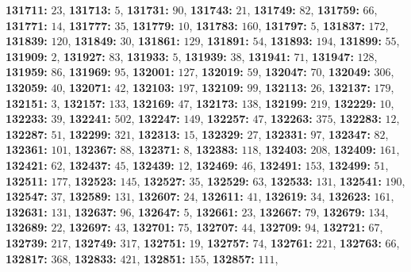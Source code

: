 \textsf{\bfseries 131711:} $23$, \textsf{\bfseries 131713:} $5$, \textsf{\bfseries 131731:} $90$, \textsf{\bfseries 131743:} $21$, \textsf{\bfseries 131749:} $82$, \textsf{\bfseries 131759:} $66$, \textsf{\bfseries 131771:} $14$, \textsf{\bfseries 131777:} $35$, \textsf{\bfseries 131779:} $10$, \textsf{\bfseries 131783:} $160$, \textsf{\bfseries 131797:} $5$, \textsf{\bfseries 131837:} $172$, \textsf{\bfseries 131839:} $120$, \textsf{\bfseries 131849:} $30$, \textsf{\bfseries 131861:} $129$, \textsf{\bfseries 131891:} $54$, \textsf{\bfseries 131893:} $194$, \textsf{\bfseries 131899:} $55$, \textsf{\bfseries 131909:} $2$, \textsf{\bfseries 131927:} $83$, \textsf{\bfseries 131933:} $5$, \textsf{\bfseries 131939:} $38$, \textsf{\bfseries 131941:} $71$, \textsf{\bfseries 131947:} $128$, \textsf{\bfseries 131959:} $86$, \textsf{\bfseries 131969:} $95$, \textsf{\bfseries 132001:} $127$, \textsf{\bfseries 132019:} $59$, \textsf{\bfseries 132047:} $70$, \textsf{\bfseries 132049:} $306$, \textsf{\bfseries 132059:} $40$, \textsf{\bfseries 132071:} $42$, \textsf{\bfseries 132103:} $197$, \textsf{\bfseries 132109:} $99$, \textsf{\bfseries 132113:} $26$, \textsf{\bfseries 132137:} $179$, \textsf{\bfseries 132151:} $3$, \textsf{\bfseries 132157:} $133$, \textsf{\bfseries 132169:} $47$, \textsf{\bfseries 132173:} $138$, \textsf{\bfseries 132199:} $219$, \textsf{\bfseries 132229:} $10$, \textsf{\bfseries 132233:} $39$, \textsf{\bfseries 132241:} $502$, \textsf{\bfseries 132247:} $149$, \textsf{\bfseries 132257:} $47$, \textsf{\bfseries 132263:} $375$, \textsf{\bfseries 132283:} $12$, \textsf{\bfseries 132287:} $51$, \textsf{\bfseries 132299:} $321$, \textsf{\bfseries 132313:} $15$, \textsf{\bfseries 132329:} $27$, \textsf{\bfseries 132331:} $97$, \textsf{\bfseries 132347:} $82$, \textsf{\bfseries 132361:} $101$, \textsf{\bfseries 132367:} $88$, \textsf{\bfseries 132371:} $8$, \textsf{\bfseries 132383:} $118$, \textsf{\bfseries 132403:} $208$, \textsf{\bfseries 132409:} $161$, \textsf{\bfseries 132421:} $62$, \textsf{\bfseries 132437:} $45$, \textsf{\bfseries 132439:} $12$, \textsf{\bfseries 132469:} $46$, \textsf{\bfseries 132491:} $153$, \textsf{\bfseries 132499:} $51$, \textsf{\bfseries 132511:} $177$, \textsf{\bfseries 132523:} $145$, \textsf{\bfseries 132527:} $35$, \textsf{\bfseries 132529:} $63$, \textsf{\bfseries 132533:} $131$, \textsf{\bfseries 132541:} $190$, \textsf{\bfseries 132547:} $37$, \textsf{\bfseries 132589:} $131$, \textsf{\bfseries 132607:} $24$, \textsf{\bfseries 132611:} $41$, \textsf{\bfseries 132619:} $34$, \textsf{\bfseries 132623:} $161$, \textsf{\bfseries 132631:} $131$, \textsf{\bfseries 132637:} $96$, \textsf{\bfseries 132647:} $5$, \textsf{\bfseries 132661:} $23$, \textsf{\bfseries 132667:} $79$, \textsf{\bfseries 132679:} $134$, \textsf{\bfseries 132689:} $22$, \textsf{\bfseries 132697:} $43$, \textsf{\bfseries 132701:} $75$, \textsf{\bfseries 132707:} $44$, \textsf{\bfseries 132709:} $94$, \textsf{\bfseries 132721:} $67$, \textsf{\bfseries 132739:} $217$, \textsf{\bfseries 132749:} $317$, \textsf{\bfseries 132751:} $19$, \textsf{\bfseries 132757:} $74$, \textsf{\bfseries 132761:} $221$, \textsf{\bfseries 132763:} $66$, \textsf{\bfseries 132817:} $368$, \textsf{\bfseries 132833:} $421$, \textsf{\bfseries 132851:} $155$, \textsf{\bfseries 132857:} $111$, 
